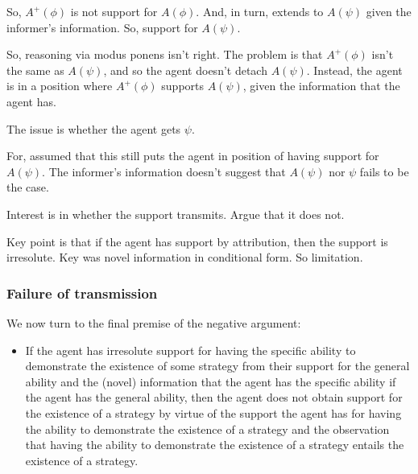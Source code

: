 \documentclass[10pt]{article}
\begin{document}
\begin{note}
  So, \(A^{+}(\phi)\) is not support for \(A(\phi)\).
  And, in turn, extends to \(A(\psi)\) given the informer's information.
  So, support for \(A(\psi)\).

  So, reasoning via modus ponens isn't right.
  The problem is that \(A^{+}(\phi)\) isn't the same as \(A(\psi)\), and so the agent doesn't detach \(A(\psi)\).
  Instead, the agent is in a position where \(A^{+}(\phi)\) supports \(A(\psi)\), given the information that the agent has.

  The issue is whether the agent gets \(\psi\).

  For, assumed that this still puts the agent in position of having support for \(A(\psi)\).
  The informer's information doesn't suggest that \(A(\psi)\) nor \(\psi\) fails to be the case.

  Interest is in whether the support transmits.
  Argue that it does not.
\end{note}

\begin{note}[Summary]
  Key point is that if the agent has support by attribution, then the support is irresolute.
  Key was novel information in conditional form.
  So limitation.
\end{note}



\subsubsection{Failure of transmission}
\label{sec:failure-transmission}

We now turn to the final premise of the negative argument:
\begin{itemize}
\item If the agent has irresolute support for having the specific ability to demonstrate the existence of some strategy from their support for the general ability and the (novel) information that the agent has the specific ability if the agent has the general ability, then the agent does not obtain support for the existence of a strategy by virtue of the support the agent has for having the ability to demonstrate the existence of a strategy and the observation that having the ability to demonstrate the existence of a strategy entails the existence of a strategy.
\end{itemize}
\end{document}
